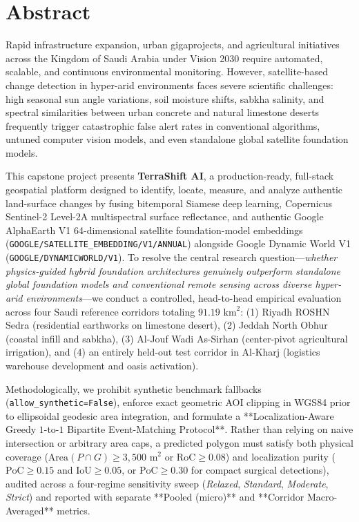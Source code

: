\chapter*{Abstract}

Rapid infrastructure expansion, urban gigaprojects, and agricultural initiatives across the Kingdom of Saudi Arabia under Vision 2030 require automated, scalable, and continuous environmental monitoring. However, satellite-based change detection in hyper-arid environments faces severe scientific challenges: high seasonal sun angle variations, soil moisture shifts, sabkha salinity, and spectral similarities between urban concrete and natural limestone deserts frequently trigger catastrophic false alert rates in conventional algorithms, untuned computer vision models, and even standalone global satellite foundation models.

This capstone project presents \textbf{TerraShift AI}, a production-ready, full-stack geospatial platform designed to identify, locate, measure, and analyze authentic land-surface changes by fusing bitemporal Siamese deep learning, Copernicus Sentinel-2 Level-2A multispectral surface reflectance, and authentic Google AlphaEarth V1 64-dimensional satellite foundation-model embeddings (\texttt{GOOGLE/SATELLITE\_EMBEDDING/V1/ANNUAL}) alongside Google Dynamic World V1 (\texttt{GOOGLE/DYNAMICWORLD/V1}). To resolve the central research question—\textit{whether physics-guided hybrid foundation architectures genuinely outperform standalone global foundation models and conventional remote sensing across diverse hyper-arid environments}—we conduct a controlled, head-to-head empirical evaluation across four Saudi reference corridors totaling $91.19\text{ km}^2$: (1) Riyadh ROSHN Sedra (residential earthworks on limestone desert), (2) Jeddah North Obhur (coastal infill and sabkha), (3) Al-Jouf Wadi As-Sirhan (center-pivot agricultural irrigation), and (4) an entirely held-out test corridor in Al-Kharj (logistics warehouse development and oasis activation).

Methodologically, we prohibit synthetic benchmark fallbacks (\texttt{allow\_synthetic=False}), enforce exact geometric AOI clipping in WGS84 prior to ellipsoidal geodesic area integration, and formulate a **Localization-Aware Greedy $1$-to-$1$ Bipartite Event-Matching Protocol**. Rather than relying on naive intersection or arbitrary area caps, a predicted polygon must satisfy both physical coverage ($\text{Area}(P \cap G) \ge 3,500\text{ m}^2$ or $\text{RoC} \ge 0.08$) and localization purity ($\text{PoC} \ge 0.15$ and $\text{IoU} \ge 0.05$, or $\text{PoC} \ge 0.30$ for compact surgical detections), audited across a four-regime sensitivity sweep (\textit{Relaxed}, \textit{Standard}, \textit{Moderate}, \textit{Strict}) and reported with separate **Pooled (micro)** and **Corridor Macro-Averaged** metrics.

